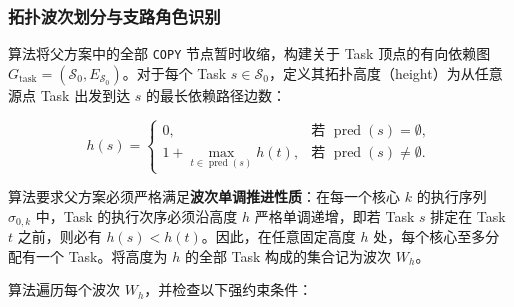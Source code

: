 \documentclass[anonymous,withtoc]{gmcm2026}
\begin{document}
\subsubsection{拓扑波次划分与支路角色识别}

算法将父方案中的全部 \texttt{COPY} 节点暂时收缩，构建关于 Task 顶点的有向依赖图 \(G_{\mathrm{task}} = (\mathcal{S}_0, E_{\mathcal{S}_0})\)。对于每个 Task \(s \in \mathcal{S}_0\)，定义其拓扑高度（height）为从任意源点 Task 出发到达 \(s\) 的最长依赖路径边数：

\begin{equation}
h(s) = \begin{cases} 0, & \text{若 } \operatorname{pred}(s) = \emptyset, \\ 1 + \max_{t \in \operatorname{pred}(s)} h(t), & \text{若 } \operatorname{pred}(s) \ne \emptyset. \end{cases}
\end{equation}

算法要求父方案必须严格满足\textbf{波次单调推进性质}：在每一个核心 \(k\) 的执行序列 \(\sigma_{0,k}\) 中，Task 的执行次序必须沿高度 \(h\) 严格单调递增，即若 Task \(s\) 排定在 Task \(t\) 之前，则必有 \(h(s) < h(t)\)。因此，在任意固定高度 \(h\) 处，每个核心至多分配有一个 Task。将高度为 \(h\) 的全部 Task 构成的集合记为波次 \(W_h\)。

算法遍历每个波次 \(W_h\)，并检查以下强约束条件：
\end{document}
